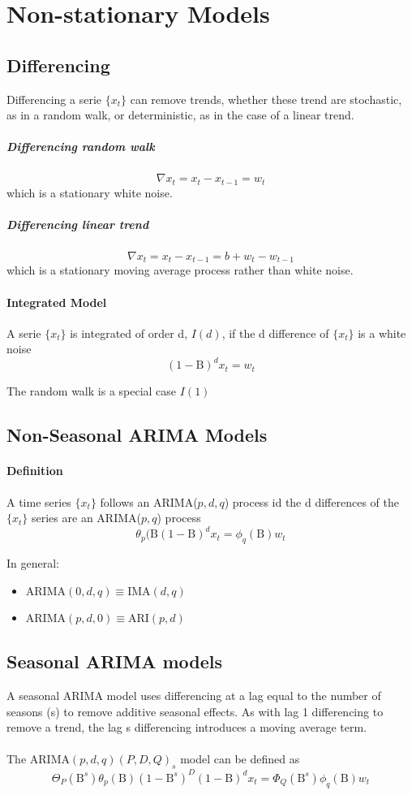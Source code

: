 \section{Non-stationary Models}

\subsection{Differencing}
Differencing a serie $\{x_t\}$ can remove trends, whether these trend are stochastic, as in a random walk, or deterministic, as in the case of a linear trend. 

\subparagraph{Differencing random walk}
\[ \nabla x_t = x_t - x_{t-1} = w_t \]
which is a stationary white noise.

\subparagraph{Differencing linear trend}
\[ \nabla x_t = x_t - x_{t-1} = b + w_t - w_{t-1} \]
which is a stationary moving average process rather than white noise.

\paragraph{Integrated Model}
A serie $\{x_t\}$ is integrated of order d, $I(d)$, if the d difference of $\{x_t\}$ is a white noise
\[ (1 - \mathrm{B})^d x_t = w_t \]

\begin{note}
    The random walk is a special case $I(1)$
\end{note}

\subsection{Non-Seasonal ARIMA Models}

\paragraph{Definition}
A time series $\{x_t\}$ follows an ARIMA($p, d, q$) process id the d differences of the $\{x_t\}$ series are an ARIMA($p, q$) process
\[ \theta_p(\mathrm{B}(1 - \mathrm{B})^d x_t = \phi_q(\mathrm{B}) w_t \]

In general:
\begin{itemize}
    \item[\textbullet] $\text{ARIMA}(0,d,q) \equiv \text{IMA}(d, q)$
    \item[\textbullet] $\text{ARIMA}(p,d,0) \equiv \text{ARI}(p,d)$
\end{itemize}

\subsection{Seasonal ARIMA models}
A seasonal ARIMA model uses differencing at a lag equal to the number of seasons (s) to remove additive seasonal effects. As with lag 1 differencing to remove a trend, the lag s differencing introduces a moving average term.
\\
\\
The ARIMA$(p,d,q)(P,D,Q)_s$ model can be defined as
\[ \Theta_P(\mathrm{B}^s)\theta_p(\mathrm{ B})(1 - \mathrm{B}^s)^D (1 - \mathrm{B})^d x_t = \Phi_Q(\mathrm{B}^s) \phi_q(\mathrm{B}) w_t \]

